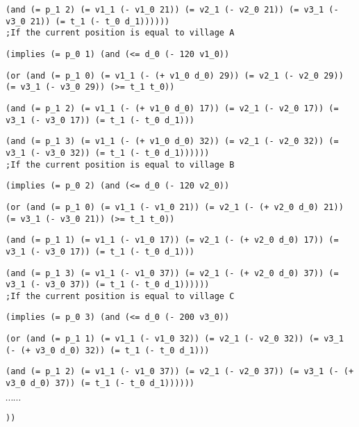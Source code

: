 \documentclass[a4paper]{article}
\begin{document}
{{\tt              (and (= p\_1 2) (= v1\_1 (- v1\_0 21)) (= v2\_1 (- v2\_0 21)) (= v3\_1 (- v3\_0 21)) (= t\_1 (- t\_0 d\_1)))))) }\\

{\tt ;If the current position is equal to village A }

{\tt (implies (= p\_0 1) (and (<= d\_0 (- 120 v1\_0)) }

{\tt          (or (and (= p\_1 0) (= v1\_1 (- (+ v1\_0 d\_0) 29)) (= v2\_1 (- v2\_0 29)) (= v3\_1 (- v3\_0 29)) (>= t\_1 t\_0)) }

{\tt              (and (= p\_1 2) (= v1\_1 (- (+ v1\_0 d\_0) 17)) (= v2\_1 (- v2\_0 17)) (= v3\_1 (- v3\_0 17)) (= t\_1 (- t\_0 d\_1))) }

{\tt              (and (= p\_1 3) (= v1\_1 (- (+ v1\_0 d\_0) 32)) (= v2\_1 (- v2\_0 32)) (= v3\_1 (- v3\_0 32)) (= t\_1 (- t\_0 d\_1)))))) }\\

{\tt ;If the current position is equal to village B }

{\tt (implies (= p\_0 2) (and (<= d\_0 (- 120 v2\_0)) }

{\tt          (or (and (= p\_1 0) (= v1\_1 (- v1\_0 21)) (= v2\_1 (- (+ v2\_0 d\_0) 21)) (= v3\_1 (- v3\_0 21)) (>= t\_1 t\_0)) }

{\tt              (and (= p\_1 1) (= v1\_1 (- v1\_0 17)) (= v2\_1 (- (+ v2\_0 d\_0) 17)) (= v3\_1 (- v3\_0 17)) (= t\_1 (- t\_0 d\_1))) }

{\tt              (and (= p\_1 3) (= v1\_1 (- v1\_0 37)) (= v2\_1 (- (+ v2\_0 d\_0) 37)) (= v3\_1 (- v3\_0 37)) (= t\_1 (- t\_0 d\_1)))))) }\\

{\tt ;If the current position is equal to village C }

{\tt (implies (= p\_0 3) (and (<= d\_0 (- 200 v3\_0)) }

{\tt          (or (and (= p\_1 1) (= v1\_1 (- v1\_0 32)) (= v2\_1 (- v2\_0 32)) (= v3\_1 (- (+ v3\_0 d\_0) 32)) (= t\_1 (- t\_0 d\_1))) }

{\tt              (and (= p\_1 2) (= v1\_1 (- v1\_0 37)) (= v2\_1 (- v2\_0 37)) (= v3\_1 (- (+ v3\_0 d\_0) 37)) (= t\_1 (- t\_0 d\_1)))))) }

$\cdots \cdots$

{\tt )) }
}
\end{document}
